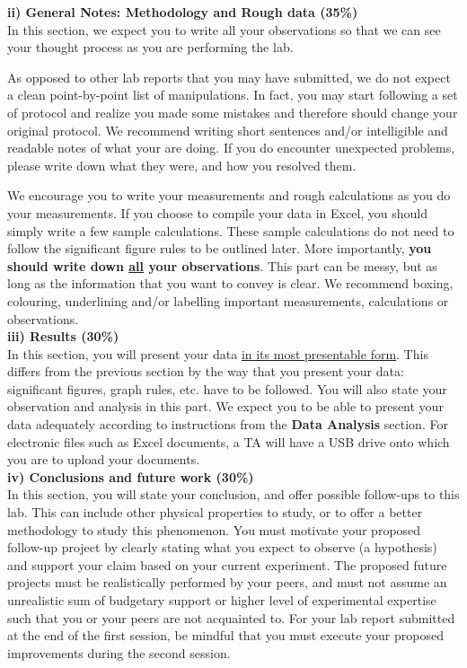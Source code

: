 \documentclass[12pt]{report}
\begin{document}
\noindent \textbf{ii) General Notes: Methodology and Rough data (35\%)}\\
In this section, we expect you to write all your observations so that we can see your thought process as you are performing the lab. 

As opposed to other lab reports that you may have submitted, we do not expect a clean point-by-point list of manipulations. In fact, you may start following a set of protocol and realize you made some mistakes and therefore should change your original protocol. We recommend writing short sentences and/or intelligible and readable notes of what your are doing. If you do encounter unexpected problems, please write down what they were, and how you resolved them.

We encourage you to write your measurements and rough calculations as you do your measurements. If you choose to compile your data in Excel, you should simply write a few sample calculations. These sample calculations do not need to follow the significant figure rules to be outlined later. More importantly, \textbf{you should write down \underline{all} your observations}. This part can be messy, but as long as the information that you want to convey is clear. We recommend boxing, colouring, underlining and/or labelling important measurements, calculations or observations. \\

\noindent \textbf{iii) Results (30\%)}\\
\noindent In this section, you will present your data \underline{in its most presentable form}. This differs from the previous section by the way that you present your data: significant figures, graph rules, etc. have to be followed. You will also state your observation and analysis in this part. We expect you to be able to present your data adequately according to instructions from the \textbf{Data Analysis} section. For electronic files such as Excel documents, a TA will have a USB drive onto which you are to upload your documents.\\

\noindent \textbf{iv) Conclusions and future work (30\%)}\\
\noindent In this section, you will state your conclusion, and offer possible follow-ups to this lab. This can include other physical properties to study, or to offer a better methodology to study this phenomenon. You must motivate your proposed follow-up project by clearly stating what you expect to observe (a hypothesis) and support your claim based on your current experiment. The proposed future projects must be realistically performed by your peers, and must not assume an unrealistic sum of budgetary support or higher level of experimental expertise such that you or your peers are not acquainted to. For your lab report submitted at the end of the first session, be mindful that you must execute your proposed improvements during the second session.
\end{document}
